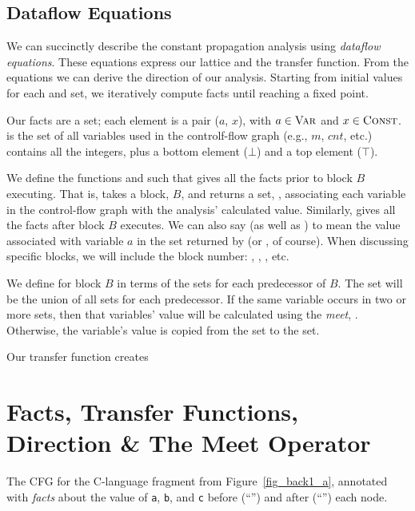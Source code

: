 \documentclass[12pt]{report}
\begin{document}
\subsection{Dataflow Equations}
\label{back_subsec_eq}

We can succinctly describe the constant propagation analysis using
\emph{dataflow equations}. These equations express our lattice and the
transfer function. From the equations we can derive the direction of
our analysis. Starting from initial values for each \inE and \out
set, we iteratively compute facts until reaching a fixed point. 

 Our facts are a set; each element is a pair ($a$, $x$),
with $a \in \textsc{Var}$ and $x \in \textsc{Const}$.  is the set of
all variables used in the controlf-flow graph (e.g., $m$, $cnt$, etc.)
\setLC contains all the integers, plus a bottom element ($\bot$) and a
top element ($\top$). 

We define the functions \inE and \out such that \inBa gives all the
facts prior to block $B$ executing. That is, \inBa takes a block, $B$,
and returns a set, , associating each variable in
the control-flow graph with the analysis' calculated value. Similarly,
\outBa gives all the facts after block $B$ executes. We can also say
 (as well as ) to mean the value associated with
variable $a$ in the set returned by \inBa (or \outBa, of course). When
discussing specific blocks, we will include the block number:
, ,
, etc.

 We define \inBa for block $B$ in terms of the \out
sets for each predecessor of $B$. The \inBa set will be the union of
all \out sets for each predecessor. If the same variable occurs in two
or more sets, then that variables' value will be calculated using the
\emph{meet}, \lub. Otherwise, the variable's value is copied from the
\out set to the \inBa set.

\afterpage{\clearpage\clearpage}

 Our transfer function creates 

\section{Facts, Transfer Functions, Direction \& The Meet Operator}
\label{sec_back4}

\begin{myfig}[th]
\centering

\caption{The CFG for the C-language fragment from
  Figure~\ref{fig_back1_a}, annotated with \emph{facts} about the
  value of \texttt{a}, \texttt{b}, and \texttt{c} before (``\inBa'') and
  after (``\outBa'') each node.}
\label{fig_back5}
\end{myfig}
\end{document}

